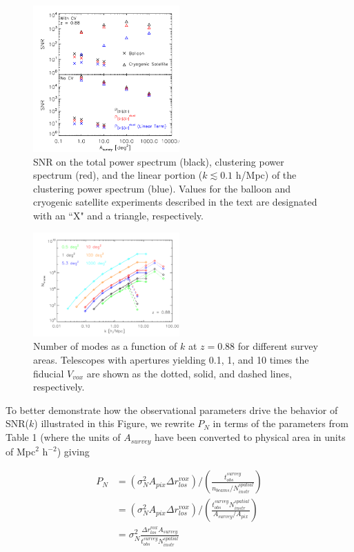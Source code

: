\documentclass[iop]{emulateapj}
\begin{document}
\begin{figure}[h]
\centering
\includegraphics[width=0.5\textwidth]{snr_tot_clust_lin_asurvey_z88}
\caption{SNR on the total power spectrum (black), clustering power spectrum (red), and the linear portion ($k\lesssim0.1$ h/Mpc) of the clustering power spectrum (blue). Values for the balloon and cryogenic satellite experiments described in the text are designated with an ``X" and a triangle, respectively.}
\label{fig:snr_asurvey}
\end{figure}


\begin{figure}[h]
\centering
\includegraphics[width=0.5\textwidth]{nmode_vs_k_z88_100sqdeg_1000sqdeg}
\caption{Number of modes as a function of $k$ at $z=0.88$ for different survey areas. Telescopes with apertures yielding 0.1, 1, and 10 times the fiducial $V_{vox}$ are shown as the dotted, solid, and dashed lines, respectively.}
\label{fig:nmode_k}
\end{figure}

To better demonstrate how the observational parameters drive the behavior of SNR($k$) illustrated in this Figure, we rewrite $P_N$ in terms of the parameters from Table 1 (where the units of $A_{survey}$ have been converted to physical area in units of Mpc$^{2}$ h$^{-2}$) giving 

\begin{equation}
\begin{split}
P_N& = \left(\sigma_N^2 A_{pix} \Delta r_{los}^{vox}\right) / \left({\frac{t_{obs}^{survey}}{n_{beams}/N_{instr}^{spatial}}}\right) \\
& = \left(\sigma_N^2 A_{pix}\Delta r_{los}^{vox}\right) /  \left(\frac{t_{obs}^{survey} N_{instr}^{spatial}}{A_{survey}/A_{pix}}\right)\\
& = \sigma_N^2 \frac{\Delta r_{los}^{vox} A_{survey}}{t_{obs}^{survey} N_{instr}^{spatial}}
\end{split}
\label{eq:pnoise}
\end{equation}
\end{document}
